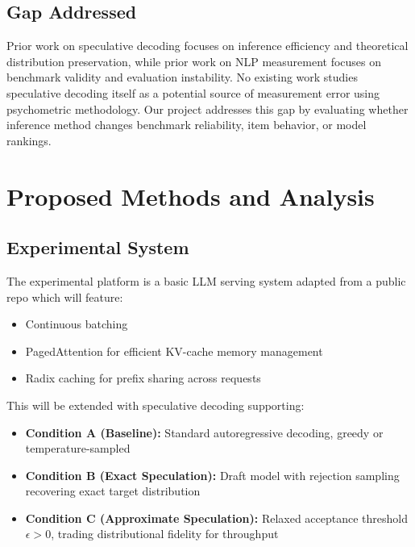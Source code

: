 \documentclass{article}
\begin{document}
\subsection{Gap Addressed}

Prior work on speculative decoding focuses on inference efficiency and theoretical distribution preservation, while prior work on NLP measurement focuses on benchmark validity and evaluation instability. No existing work studies speculative decoding itself as a potential source of measurement error using psychometric methodology. Our project addresses this gap by evaluating whether inference method changes benchmark reliability, item behavior, or model rankings.

\section{Proposed Methods and Analysis}

\subsection{Experimental System}

The experimental platform is a basic LLM serving system adapted from a public repo which will feature:
\begin{itemize}[leftmargin=1.5em]
    \item Continuous batching
    \item PagedAttention for efficient KV-cache memory management
    \item Radix caching for prefix sharing across requests
\end{itemize}

This will be extended with speculative decoding supporting:
\begin{itemize}[leftmargin=1.5em]
    \item \textbf{Condition A (Baseline):} Standard autoregressive decoding, greedy or temperature-sampled
    \item \textbf{Condition B (Exact Speculation):} Draft model with rejection sampling recovering exact target distribution
    \item \textbf{Condition C (Approximate Speculation):} Relaxed acceptance threshold $\epsilon > 0$, trading distributional fidelity for throughput
\end{itemize}
\end{document}
